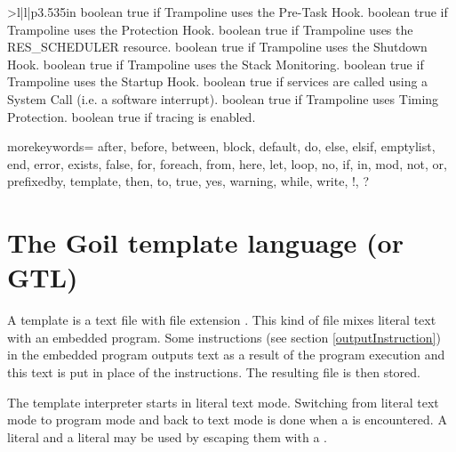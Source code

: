 \begin{sortedtable}{>{\va}l|l|p{3.535in}}
{boolean}
{true if Trampoline uses the Pre-Task Hook.} 
{boolean}
{true if Trampoline uses the Protection Hook.} 
{boolean}
{true if Trampoline uses the RES_SCHEDULER resource.} 
{boolean}
{true if Trampoline uses the Shutdown Hook.} 
{boolean}
{true if Trampoline uses the Stack Monitoring.} 
{boolean}
{true if Trampoline uses the Startup Hook.} 
{boolean}
{true if services are called using a System Call (i.e. a software interrupt).} 
{boolean}
{true if Trampoline uses Timing Protection.} 
{boolean}
{true if tracing is enabled.} 
\end{sortedtable}

{
  morekeywords= {
	  after,
	  before,
	  between,
	  block,
	  default,
	  do,
	  else,
	  elsif,
	  emptylist,
	  end,
	  error,
	  exists,
	  false,
	  for,
	  foreach,
	  from,
	  here,
	  let,
	  loop,
	  no,
	  if,
	  in,
	  mod,
	  not,
	  or,
	  prefixedby,
	  template,
	  then,
	  to,
	  true,
	  yes,
	  warning,
	  while,
	  write,
	  !,
	  ?
	}
}


\section{The Goil template language (or GTL)}

A template is a text file with file extension . This kind of file mixes literal text with an embedded program. Some instructions (see section \ref{outputInstruction}) in the embedded program outputs text as a result of the program execution and this text is put in place of the instructions. The resulting file is then stored.

The template interpreter starts in literal text mode. Switching from literal text mode to program mode and back to text mode is done when a \character{\%} is encountered. A literal \character{\%} and a literal \character{\textbackslash} may be used by escaping them with a \character{\textbackslash}.

